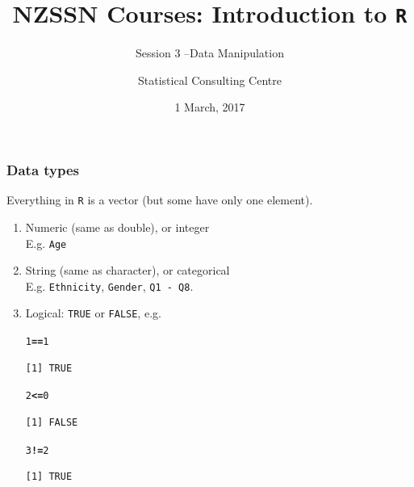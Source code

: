 \documentclass{beamer}\usepackage[]{graphicx}\usepackage[]{color}
\author[SCC]{Statistical Consulting Centre}%
\institute[\href{mailto:consulting@stat.auckland.ac.nz}
  {consulting@stat.auckland.ac.nz}]{\href{mailto:consulting@stat.auckland.ac.nz}
  {consulting@stat.auckland.ac.nz}\\
The Department of Statistics\\
The University of Auckland}
\title[Session 3 -- Data Manipulation]{NZSSN Courses: Introduction to \texttt{R}}
\subtitle{Session 3 --Data Manipulation}
\date{1 March, 2017}
\makeatletter
\newcommand{\hlnum}[1]{\textcolor[rgb]{0.533,0,0.133}{#1}}%
\newcommand{\hlopt}[1]{\textcolor[rgb]{0,0,0}{\textbf{#1}}}%
\newenvironment{kframe}{%
 \def\at@end@of@kframe{}%
 \ifinner\ifhmode%
  \def\at@end@of@kframe{\end{minipage}}%
  \begin{minipage}{\columnwidth}%
 \fi\fi%
 \def\FrameCommand##1{\hskip\@totalleftmargin \hskip-\fboxsep
 \colorbox{shadecolor}{##1}\hskip-\fboxsep
     \hskip-\linewidth \hskip-\@totalleftmargin \hskip\columnwidth}%
 \MakeFramed {\advance\hsize-\width
   \@totalleftmargin\z@ \linewidth\hsize
   \@setminipage}}%
 {\par\unskip\endMakeFramed%
 \at@end@of@kframe}
\newenvironment{knitrout}{}{} %
\makeatother
\begin{document}
\maketitle
 
\begin{frame}[fragile]
  \frametitle{Data types}


  Everything in \texttt{R} is a vector (but some have only one
  element).
  \begin{enumerate}
  \item Numeric (same as double), or integer\\
    E.g. \texttt{Age}
  \item String (same as character), or categorical\\
    E.g. \texttt{Ethnicity}, \texttt{Gender}, \texttt{Q1 - Q8}.
\item Logical: \texttt{TRUE} or \texttt{FALSE}, e.g.
\begin{knitrout}
\color{fgcolor}\begin{kframe}
\begin{alltt}
\hlnum{1} \hlopt{==} \hlnum{1}
\end{alltt}
\begin{verbatim}
[1] TRUE
\end{verbatim}
\begin{alltt}
\hlnum{2} \hlopt{<=} \hlnum{0}
\end{alltt}
\begin{verbatim}
[1] FALSE
\end{verbatim}
\begin{alltt}
\hlnum{3} \hlopt{!=} \hlnum{2}
\end{alltt}
\begin{verbatim}
[1] TRUE
\end{verbatim}
\end{kframe}
\end{knitrout}
  \end{enumerate}
\end{frame}
\end{document}
